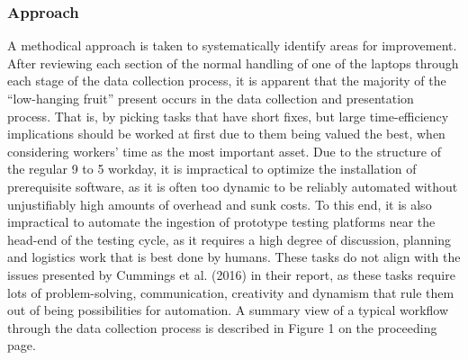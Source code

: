 \documentclass[12pt]{article}
\begin{document}
\subsubsection{Approach}
\indent\hspace{0.5in} A methodical approach is taken to systematically identify areas for improvement. After reviewing each section of the normal handling of one of the laptops through each stage of the data collection process, it is apparent that the majority of the “low-hanging fruit” present occurs in the data collection and presentation process. That is, by picking tasks that have short fixes, but large time-efficiency implications should be worked at first due to them being valued the best, when considering workers' time as the most important asset. Due to the structure of the regular 9 to 5 workday, it is impractical to optimize the installation of prerequisite software, as it is often too dynamic to be reliably automated without unjustifiably high amounts of overhead and sunk costs. To this end, it is also impractical to automate the ingestion of prototype testing platforms near the head-end of the testing cycle, as it requires a high degree of discussion, planning and logistics work that is best done by humans. These tasks do not align with the issues presented by Cummings et al. (2016) in their report, as these tasks require lots of problem-solving, communication, creativity and dynamism that rule them out of being possibilities for automation. A summary view of a typical workflow through the data collection process is described in Figure 1 on the proceeding page.
\newpage
\end{document}
